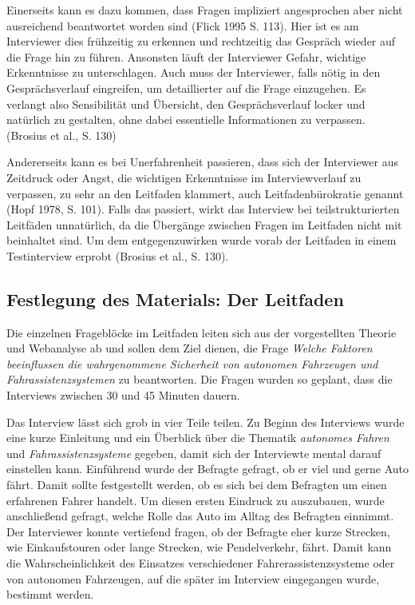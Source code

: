 \documentclass[12pt]{article}
\begin{document}
Einerseits kann es dazu kommen, dass Fragen impliziert angesprochen aber nicht ausreichend beantwortet worden sind (Flick 1995 S. 113). Hier ist es am Interviewer dies frühzeitig zu erkennen und rechtzeitig das Gespräch wieder auf die Frage hin zu führen. Ansonsten läuft der Interviewer Gefahr, wichtige Erkenntnisse zu unterschlagen. Auch muss der Interviewer, falls nötig in den Gesprächsverlauf eingreifen, um detaillierter auf die Frage einzugehen. Es verlangt also Sensibilität und Übersicht, den Gesprächsverlauf locker und natürlich zu gestalten, ohne dabei essentielle Informationen zu verpassen. (Brosius et al., S. 130)

Andererseits kann es bei Unerfahrenheit passieren, dass sich der Interviewer aus Zeitdruck oder Angst, die wichtigen Erkenntnisse im Interviewverlauf zu verpassen, zu sehr an den Leitfaden klammert, auch \glqq Leitfadenbürokratie\grqq{} genannt (Hopf 1978, S. 101). Falls das passiert, wirkt das Interview bei teilstrukturierten Leitfäden unnatürlich, da die Übergänge zwischen Fragen im Leitfaden nicht mit beinhaltet sind. Um dem entgegenzuwirken wurde vorab der Leitfaden in einem Testinterview erprobt (Brosius et al., S. 130).

\subsection{Festlegung des Materials: Der Leitfaden}
Die einzelnen Frageblöcke im Leitfaden leiten sich aus der vorgestellten Theorie und Webanalyse ab und sollen dem Ziel dienen, die Frage \emph{Welche Faktoren beeinflussen die wahrgenommene Sicherheit von autonomen Fahrzeugen und Fahrassistenzsystemen} zu beantworten. Die Fragen wurden so geplant, dass die Interviews zwischen 30 und 45 Minuten dauern.

Das Interview lässt sich grob in vier Teile teilen. Zu Beginn des Interviews wurde eine kurze Einleitung und ein Überblick über die Thematik \emph{autonomes Fahren} und \emph{Fahrassistenzsysteme} gegeben, damit sich der Interviewte mental darauf einstellen kann.
Einführend wurde der Befragte gefragt, ob er viel und gerne Auto fährt. Damit sollte festgestellt werden, ob es sich bei dem Befragten um einen erfahrenen Fahrer handelt. Um diesen ersten Eindruck zu auszubauen, wurde anschließend gefragt, welche Rolle das Auto im Alltag des Befragten einnimmt. Der Interviewer konnte vertiefend fragen, ob der Befragte eher kurze Strecken, wie Einkaufstouren oder lange Strecken, wie Pendelverkehr, fährt. Damit kann die Wahrscheinlichkeit des Einsatzes verschiedener Fahrerassistenzsysteme oder von autonomen Fahrzeugen, auf die später im Interview eingegangen wurde, bestimmt werden.
\end{document}

